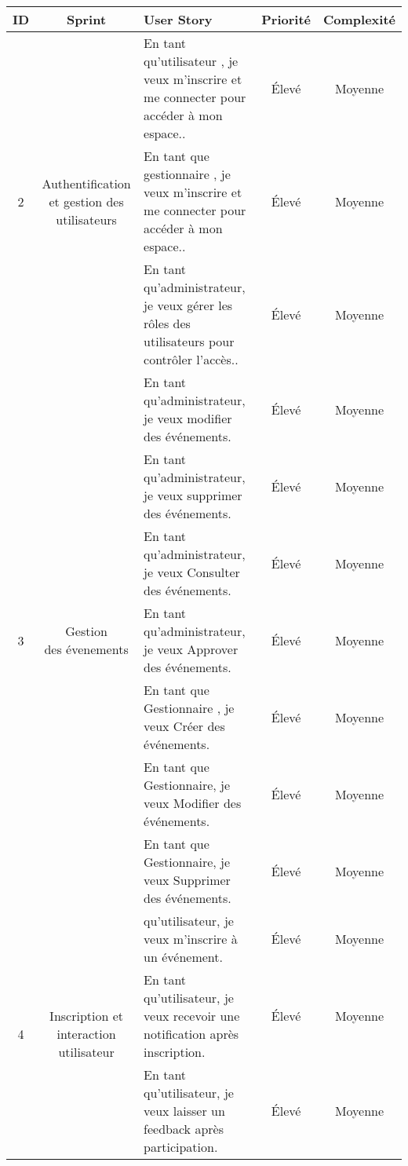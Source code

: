 \begin{table}[h!]
\renewcommand{\arraystretch}{1.6}
\setlength{\tabcolsep}{5pt}
\centering
\begin{tabular}{|c|c|m{7cm}|c|c|}
\hline
\textbf{ID} & \textbf{Sprint} & \textbf{User Story} & \textbf{Priorité} & \textbf{Complexité} \\
\hline


\multirow{3}{*}{2} & \multirow{3}{*}{\parbox{3cm}{\centering Authentification\\ et gestion des utilisateurs}} 
& En tant qu’utilisateur , je veux m’inscrire et me connecter pour accéder à mon espace.. & Élevé & Moyenne \\
\cline{3-5}
&& En tant que gestionnaire , je veux m’inscrire et me connecter pour accéder à mon espace.. & Élevé & Moyenne \\
\cline{3-5}
& & En tant qu’administrateur, je veux gérer les rôles des utilisateurs pour contrôler l’accès.. & Élevé & Moyenne \\
\cline{3-5}
\hline


\multirow{7}{*}{3} & \multirow{7}{*}{\parbox{3cm}{\centering Gestion\\ des évenements }} 
& En tant qu’administrateur, je veux  modifier  des événements. & Élevé & Moyenne \\
\cline{3-5}
& & En tant qu’administrateur, je veux supprimer des événements. & Élevé & Moyenne \\
\cline{3-5}
& & En tant qu’administrateur, je veux Consulter des événements. & Élevé & Moyenne \\
\cline{3-5}
& & En tant qu’administrateur, je veux Approver des événements. & Élevé & Moyenne \\
\cline{3-5}
& & En tant que Gestionnaire , je veux Créer des événements. & Élevé & Moyenne \\
\cline{3-5}
& & En tant que Gestionnaire, je veux Modifier des événements. & Élevé & Moyenne \\
\cline{3-5}
& & En tant que Gestionnaire, je veux Supprimer  des événements. & Élevé & Moyenne \\
\hline

\multirow{3}{*}{4} & \multirow{3}{*}{\parbox{3cm}{\centering  Inscription et\\  interaction utilisateur }} 
& qu’utilisateur, je veux m’inscrire à un événement. & Élevé & Moyenne \\
\cline{3-5}
& & En tant qu’utilisateur, je veux recevoir une notification après inscription. & Élevé & Moyenne \\
\cline{3-5}
& & En tant qu’utilisateur, je veux laisser un feedback après participation. & Élevé & Moyenne \\


\end{tabular}
\end{table}

